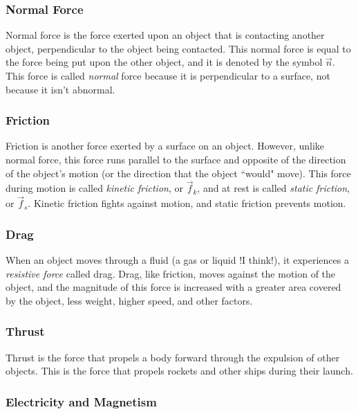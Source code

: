\documentclass[12pt,letterpaper]{article}
\begin{document}
\subsubsection{Normal Force} 

Normal force is the force exerted upon an object that is contacting another object, perpendicular to the object being contacted. This normal force is equal to the force being put upon the other object, and it is denoted by the symbol $\vec{n}$. This force is called \textit{normal} force because it is perpendicular to a surface, not because it isn't abnormal.

\subsubsection{Friction} 

Friction is another force exerted by a surface on an object. However, unlike normal force, this force runs parallel to the surface and opposite of the direction of the object's motion (or the direction that the object ``would" move). This force during motion is called \textit{kinetic friction}, or $\vec{f}_{k}$, and at rest is called \textit{static friction}, or $\vec{f}_{s}$. Kinetic friction fights against motion, and static friction prevents motion.

\subsubsection{Drag} 

When an object moves through a fluid (a gas or liquid !I think!), it experiences a \textit{resistive force} called drag. Drag, like friction, moves against the motion of the object, and the magnitude of this force is increased with a greater area covered by the object, less weight, higher speed, and other factors.

\subsubsection{Thrust} 

Thrust is the force that propels a body forward through the expulsion of other objects. This is the force that propels rockets and other ships during their launch. 

\subsubsection{Electricity and Magnetism} 
\end{document}
